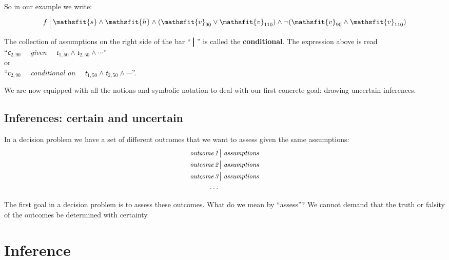 \documentclass[
  a4paper,
  DIV=11,
  numbers=noendperiod,
  oneside]{scrreprt}
\begin{document}
So in our example we write: \[
f \nonscript\:\Big\vert\nonscript\:\mathopen{}
\mathsfit{s} \land \mathsfit{h} \land
(\mathsfit{v}_{90} \lor \mathsfit{v}_{110})
\land
\lnot(\mathsfit{v}_{90} \land \mathsfit{v}_{110})
\]

The collection of assumptions on the right side of the bar
{``\(\pmb{\nonscript\:\big\vert\nonscript\:\mathopen{}}\)''} is called
the {\textbf{conditional}}. The expression above is read\\
{``\(\mathsfit{c}_{2,90}\)~~ \emph{given}~~
\(\mathsfit{t}_{1,50} \land \mathsfit{t}_{2,50} \land\dotsb\)''}\\
or\\
{``\(\mathsfit{c}_{2,90}\)~~ \emph{conditional on}~~
\(\mathsfit{t}_{1,50} \land \mathsfit{t}_{2,50} \land\dotsb\)''.}

\hfill\break

We are now equipped with all the notions and symbolic notation to deal
with our first concrete goal: drawing uncertain inferences.

\hypertarget{inferences-certain-and-uncertain}{%
\section{Inferences: certain and
uncertain}\label{inferences-certain-and-uncertain}}

In a decision problem we have a set of different outcomes that we want
to assess given the same assumptions: \[\begin{aligned}
\textit{\small outcome\,1} &\pmb{\nonscript\:\big\vert\nonscript\:\mathopen{}} \textit{\small assumptions}
\\
\textit{\small outcome\,2} &\pmb{\nonscript\:\big\vert\nonscript\:\mathopen{}} \textit{\small assumptions}
\\
\textit{\small outcome\,3} &\pmb{\nonscript\:\big\vert\nonscript\:\mathopen{}} \textit{\small assumptions}
\\
\dotso&
\end{aligned}\]

The first goal in a decision problem is to assess these outcomes. What
do we mean by ``assess''? We cannot demand that the truth or falsity of
the outcomes be determined with certainty.


\hypertarget{inference}{%
\chapter{Inference}\label{inference}}
\end{document}
